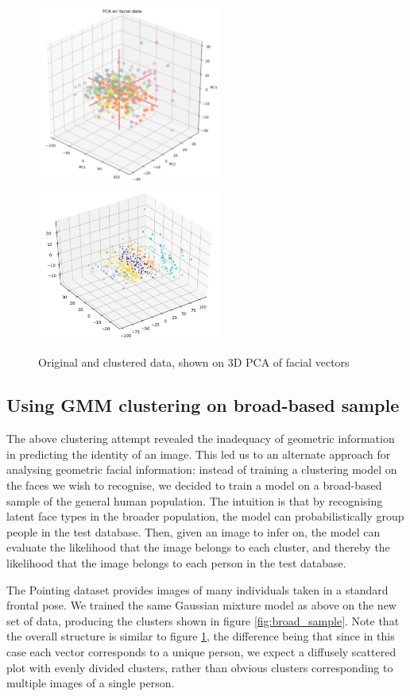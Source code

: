 \documentclass{article}
\begin{document}
\begin{figure}[ht]
  \centering
  \includegraphics[width=6cm]{images/pca_1.png}
  \includegraphics[width=6cm]{images/cluster_1.png}
  \caption{Original and clustered data, shown on 3D PCA of facial vectors}
  \label{fig:pca_cluster}
\end{figure}

\subsection{Using GMM clustering on broad-based sample}

The above clustering attempt revealed the inadequacy of geometric information in
predicting the identity of an image. This led us to an alternate approach for
analysing geometric facial information: instead of training a clustering model
on the faces we wish to recognise, we decided to train a model on a broad-based
sample of the general human population. The intuition is that by recognising
latent face types in the broader population, the model can probabilistically
group people in the test database. Then, given an image to infer on, the model
can evaluate the likelihood that the image belongs to each cluster, and thereby
the likelihood that the image belongs to each person in the test database.

The Pointing dataset provides images of many individuals taken in
a standard frontal pose. We trained the same Gaussian mixture model as above on
the new set of data, producing the clusters shown in figure
\ref{fig:broad_sample}. Note that the overall structure is similar to figure
\ref{fig:pca_cluster}, the difference being that since in this case each vector
corresponds to a unique person, we expect a diffusely scattered plot with evenly
divided clusters, rather than obvious clusters corresponding to multiple images
of a single person.
\end{document}
